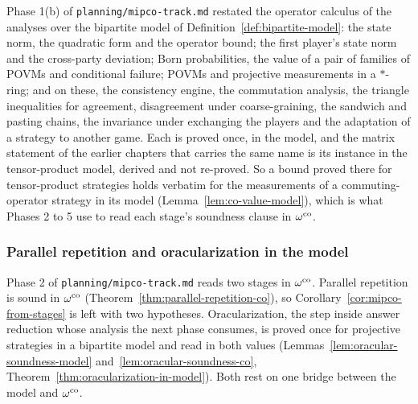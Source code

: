 \begin{remark}
\label{rem:model-calculus}
Phase 1(b) of \texttt{planning/mipco-track.md} restated the operator calculus of the analyses
over the bipartite model of Definition~\ref{def:bipartite-model}: the state norm, the quadratic
form and the operator bound; the first player's state norm and the cross-party deviation; Born
probabilities, the value of a pair of families of POVMs and conditional failure; POVMs and
projective measurements in a $*$-ring; and on these, the consistency engine, the commutation
analysis, the triangle inequalities for agreement, disagreement under coarse-graining, the
sandwich and pasting chains, the invariance under exchanging the players and the adaptation of a
strategy to another game. Each is proved once, in the model, and the matrix statement of the
earlier chapters that carries the same name is its instance in the tensor-product model, derived
and not re-proved. So a bound proved there for tensor-product strategies holds verbatim for the
measurements of a commuting-operator strategy in its model (Lemma~\ref{lem:co-value-model}),
which is what Phases 2 to 5 use to read each stage's soundness clause in $\omega^{\mathrm{co}}$.
\end{remark}

\subsubsection{Parallel repetition and oracularization in the model}
\label{sec:ds-mipco-phase2}

Phase 2 of \texttt{planning/mipco-track.md} reads two stages in $\omega^{\mathrm{co}}$. Parallel repetition
is sound in $\omega^{\mathrm{co}}$ (Theorem~\ref{thm:parallel-repetition-co}), so
Corollary~\ref{cor:mipco-from-stages} is left with two hypotheses. Oracularization, the step
inside answer reduction whose analysis the next phase consumes, is proved once for projective
strategies in a bipartite model and read in both values
(Lemmas~\ref{lem:oracular-soundness-model} and~\ref{lem:oracular-soundness-co},
Theorem~\ref{thm:oracularization-in-model}). Both rest on one bridge between the model and
$\omega^{\mathrm{co}}$.

